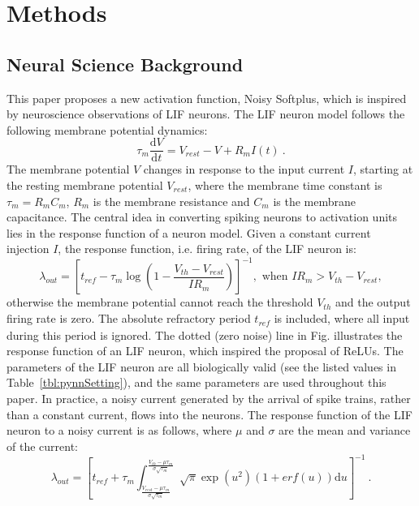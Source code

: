 \documentclass[runningheads,a4paper]{llncs}
\def\D{\mathrm{d}}
\begin{document}
	\section{Methods}
	\subsection{Neural Science Background}
	This paper proposes a new activation function, Noisy Softplus, which is inspired by neuroscience observations of LIF neurons.
	The LIF neuron model follows the following membrane potential dynamics:
	\begin{equation}
	\tau_m \frac{\D V}{\D t}=V_{rest} - V + R_{m} I(t) ~.
	\label{eq:LIF}
	\end{equation}
	The membrane potential $V$ changes in response to the input current $I$, starting at the resting membrane potential $V_{rest}$, where the membrane time constant is $\tau_m = R_mC_m$, $R_m$ is the membrane resistance and $C_m$ is the membrane capacitance.
	The central idea in converting spiking neurons to activation units lies in the response function of a neuron model.
	Given a constant current injection $I$, the response function, i.e. firing rate, of the LIF neuron is:
	\begin{equation}
	\lambda_\mathit{out}=
	\left [ t_\mathit{ref}-\tau_m\log \left ( 1-\frac{V_{th}-V_\mathit{rest}}{IR_m}  \right )\right ]^{-1}, \textrm{~when~} IR_m>V_{th}-V_{rest},
	\label{equ:consI}
	\end{equation}
	otherwise the membrane potential cannot reach the threshold $V_{th}$ and the output firing rate is zero. 
	The absolute refractory period $t_\mathit{ref}$ is included, where all input during this period is ignored.
	The dotted (zero noise) line in Fig. illustrates the response function of an LIF neuron, which inspired the proposal of ReLUs.
	The parameters of the LIF neuron are all biologically valid (see the listed values in Table~\ref{tbl:pynnSetting}), and the same parameters are used throughout this paper.
	In practice, a noisy current generated by the arrival of spike trains, rather than a constant current, flows into the neurons.
	The response function
	of the LIF neuron to a noisy current is as follows, where $\mu$ and $\sigma$ are the mean and variance of the current:
	\begin{equation}
	\lambda_\mathit{out}=
	\left [ t_\mathit{ref}+\tau_m \int_{\frac{V_\mathit{rest}-\mu \tau_m }{\sigma \sqrt{\tau_m}}}^{\frac{V_{th}-\mu \tau_m }{\sigma \sqrt{\tau_m}}} \sqrt{\pi} \exp(u^{2}) (1+erf(u)) \D u \right ]^{-1} ~.
	\label{equ:noiseI}
	\end{equation}
	
\end{document}
